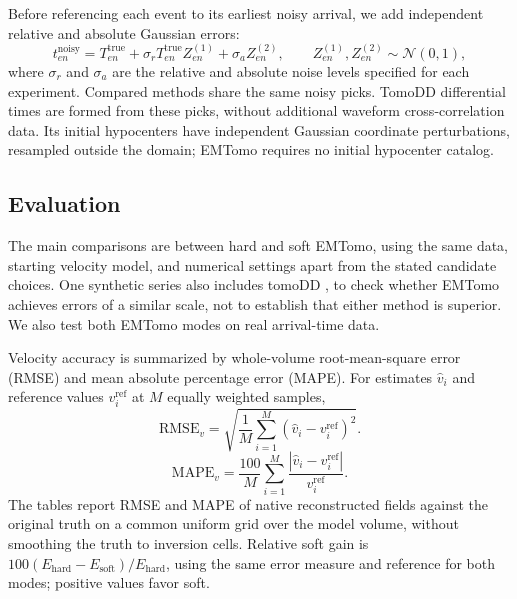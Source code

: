 \documentclass[12pt, a4paper]{article}
\begin{document}
Before referencing each event to its earliest noisy arrival, we add independent relative and absolute Gaussian errors:
\begin{equation}
 t^{\mathrm{noisy}}_{en}=T^{\mathrm{true}}_{en}
 +\sigma_r T^{\mathrm{true}}_{en}Z^{(1)}_{en}+\sigma_a Z^{(2)}_{en},
 \qquad Z^{(1)}_{en},Z^{(2)}_{en}\sim\mathcal N(0,1),
\label{eq:synthetic_noise}
\end{equation}
where $\sigma_r$ and $\sigma_a$ are the relative and absolute noise levels specified for each experiment. Compared methods share the same noisy picks. TomoDD differential times are formed from these picks, without additional waveform cross-correlation data. Its initial hypocenters have independent Gaussian coordinate perturbations, resampled outside the domain; EMTomo requires no initial hypocenter catalog.

\subsection{Evaluation}
\label{subsec:metrics}

The main comparisons are between hard and soft EMTomo, using the same data, starting velocity model, and numerical settings apart from the stated candidate choices. One synthetic series also includes tomoDD \parencite{zhang2003}, to check whether EMTomo achieves errors of a similar scale, not to establish that either method is superior. We also test both EMTomo modes on real arrival-time data.

Velocity accuracy is summarized by whole-volume root-mean-square error (RMSE) and mean absolute percentage error (MAPE). For estimates $\widehat v_i$ and reference values $v_i^{\mathrm{ref}}$ at $M$ equally weighted samples,
\begin{equation}
\mathrm{RMSE}_v=\sqrt{\frac{1}{M}\sum_{i=1}^{M}(\widehat v_i-v_i^{\mathrm{ref}})^2}.
\label{eq:velocity_metrics}
\end{equation}
\begin{equation}
\mathrm{MAPE}_v=\frac{100}{M}\sum_{i=1}^{M}\frac{|\widehat v_i-v_i^{\mathrm{ref}}|}{v_i^{\mathrm{ref}}}.
\label{eq:velocity_mape}
\end{equation}
The tables report RMSE and MAPE of native reconstructed fields against the original truth on a common uniform grid over the model volume, without smoothing the truth to inversion cells. Relative soft gain is $100(E_{\mathrm{hard}}-E_{\mathrm{soft}})/E_{\mathrm{hard}}$, using the same error measure and reference for both modes; positive values favor soft.
\end{document}
